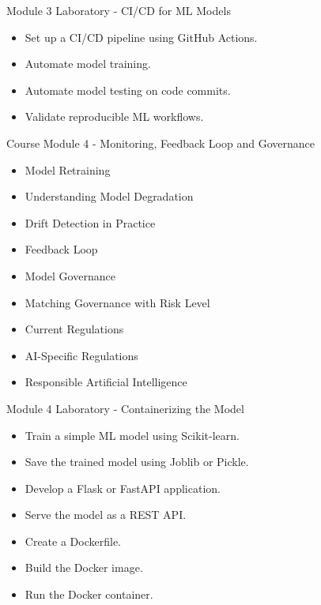 \documentclass[aspectratio=169]{beamer}
\begin{document}
\begin{frame}{Module 3 Laboratory - CI/CD for ML Models}

\begin{itemize}
\item Set up a CI/CD pipeline using GitHub Actions.
\item Automate model training.
\item Automate model testing on code commits.
\item Validate reproducible ML workflows.
\end{itemize}

\end{frame}

\begin{frame}{Course Module 4 - Monitoring, Feedback Loop and Governance}
\begin{itemize}

\item Model Retraining
\item Understanding Model Degradation
\item Drift Detection in Practice
\item Feedback Loop
\item Model Governance
\item Matching Governance with Risk Level
\item Current Regulations
\item AI-Specific Regulations
\item Responsible Artificial Intelligence

\end{itemize}
\end{frame}

\begin{frame}{Module 4 Laboratory - Containerizing the Model}

\begin{itemize}

\item Train a simple ML model using Scikit-learn.
\item Save the trained model using Joblib or Pickle.
\item Develop a Flask or FastAPI application.
\item Serve the model as a REST API.
\item Create a Dockerfile.
\item Build the Docker image.
\item Run the Docker container.

\end{itemize}

\end{frame}
\end{document}
